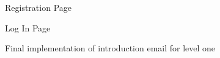 \documentclass{l4proj}
\begin{document}
\begin{appendices}
\begin{figure}[H]
    \caption{Registration Page}
    \label{fig:registration_page}
\end{figure}



\begin{figure}[H]
    \caption{Log In Page}
    \label{fig:log_in_page}
\end{figure}


\begin{figure}[H]
    \caption{Final implementation of introduction email for level one}
    \label{fig:intro_final}
\end{figure}


\end{appendices}
\end{document}
